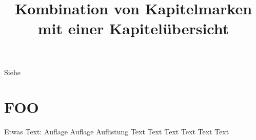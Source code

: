 \documentclass{dtk}
\begin{document}
\title[Kurztitel 1]{Kombination von Kapitelmarken mit einer Kapitelübersicht}

\maketitle
\nocite{*}
Siehe~\cite{knuth:ct:a}

\section{FOO}

Etwas Text: Auflage Auf\-\hspace{0pt}lage Auflistung Text Text Text
Text Text Text

\clearpage

\printbibliography
\end{document}
